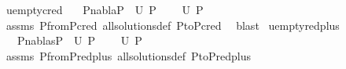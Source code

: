 \begin{isabellebody}
%
\endisadelimproof
\isanewline
\isanewline
{}\isamarkupfalse%
\ u{\isacharunderscore}{\kern0pt}empty{\isacharunderscore}{\kern0pt}cred{\isacharcolon}{\kern0pt}\isanewline
\ \ \ {\isachardoublequoteopen}P{}{\isasymturnstile}nabla{\isasymrightarrow}P{}{\isachardoublequoteclose}\ \ {\isachardoublequoteopen}U\ P{}\ {\isacharequal}{\kern0pt}{\isacharbraceleft}{\kern0pt}{\isacharbraceright}{\kern0pt}{\isachardoublequoteclose}\isanewline
\ \ \ {\isachardoublequoteopen}U\ P{}{\isacharequal}{\kern0pt}{\isacharbraceleft}{\kern0pt}{\isacharbraceright}{\kern0pt}{\isachardoublequoteclose}\isanewline
%
\isadelimproof
\ \ %
\endisadelimproof
%
\isatagproof
{}\isamarkupfalse%
\ assms\ P{}{\isacharunderscore}{\kern0pt}from{\isacharunderscore}{\kern0pt}P{}{\isacharunderscore}{\kern0pt}cred\ all{\isacharunderscore}{\kern0pt}solutions{\isacharunderscore}{\kern0pt}def\ P{}{\isacharunderscore}{\kern0pt}to{\isacharunderscore}{\kern0pt}P{}{\isacharunderscore}{\kern0pt}cred\ \isamarkupfalse%
\ blast%
\endisatagproof
{\isafoldproof}%
%
\isadelimproof
\isanewline
%
\endisadelimproof
\isanewline
\isanewline
{}\isamarkupfalse%
\ u{\isacharunderscore}{\kern0pt}empty{\isacharunderscore}{\kern0pt}red{\isacharunderscore}{\kern0pt}plus{\isacharcolon}{\kern0pt}\ \isanewline
\ \ \ {\isachardoublequoteopen}P{}{\isasymTurnstile}{\isacharparenleft}{\kern0pt}nabla{\isacharcomma}{\kern0pt}s{\isacharparenright}{\kern0pt}{\isasymRightarrow}P{}{\isachardoublequoteclose}\ \ {\isachardoublequoteopen}U\ P{}\ {\isacharequal}{\kern0pt}{\isacharbraceleft}{\kern0pt}{\isacharbraceright}{\kern0pt}{\isachardoublequoteclose}\isanewline
\ \ \ {\isachardoublequoteopen}U\ P{}{\isacharequal}{\kern0pt}{\isacharbraceleft}{\kern0pt}{\isacharbraceright}{\kern0pt}{\isachardoublequoteclose}\isanewline
%
\isadelimproof
\ \ %
\endisadelimproof
%
\isatagproof
{}\isamarkupfalse%
\ assms\ P{}{\isacharunderscore}{\kern0pt}from{\isacharunderscore}{\kern0pt}P{}{\isacharunderscore}{\kern0pt}red{\isacharunderscore}{\kern0pt}plus\ all{\isacharunderscore}{\kern0pt}solutions{\isacharunderscore}{\kern0pt}def\ P{}{\isacharunderscore}{\kern0pt}to{\isacharunderscore}{\kern0pt}P{}{\isacharunderscore}{\kern0pt}red{\isacharunderscore}{\kern0pt}plus{}\ \isamarkupfalse%

\end{isabellebody}
